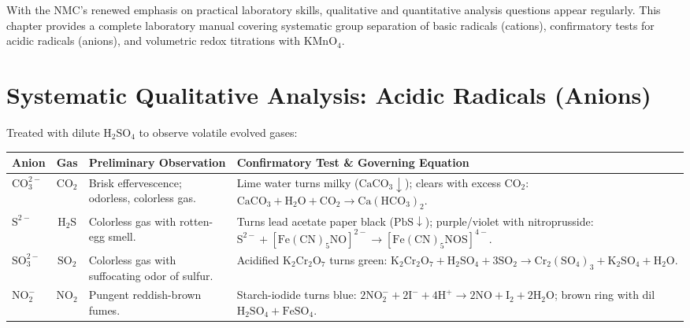 \documentclass[10pt,twoside,openright]{book}
\begin{document}
With the NMC's renewed emphasis on practical laboratory skills, qualitative and quantitative analysis questions appear regularly. This chapter provides a complete laboratory manual covering systematic group separation of basic radicals (cations), confirmatory tests for acidic radicals (anions), and volumetric redox titrations with KMnO$_4$.

\section{Systematic Qualitative Analysis: Acidic Radicals (Anions)}

\begin{conceptbox}
Treated with dilute $\mathrm{H_2SO_4}$ to observe volatile evolved gases:
\begin{center}
\scriptsize
\setlength{\tabcolsep}{2.5pt}
\renewcommand{\arraystretch}{1.15}
\begin{tabularx}{\linewidth}{|l|c|p{2.6cm}|X|}
\hline
\textbf{Anion} & \textbf{Gas} & \textbf{Preliminary Observation} & \textbf{Confirmatory Test \& Governing Equation} \\
\hline
$\mathrm{CO_3^{2-}}$ & $\mathrm{CO_2}$ & Brisk effervescence; odorless, colorless gas. & Lime water turns milky ($\mathrm{CaCO}_3 \downarrow$); clears with excess $\mathrm{CO_2}$: $\mathrm{CaCO_3} + \mathrm{H_2O} + \mathrm{CO_2} \to \mathrm{Ca(HCO_3)_2}$. \\
\hline
$\mathrm{S^{2-}}$ & $\mathrm{H_2S}$ & Colorless gas with rotten-egg smell. & Turns lead acetate paper black ($\mathrm{PbS} \downarrow$); purple/violet with nitroprusside: $\mathrm{S^{2-}} + [\mathrm{Fe(CN)_5NO}]^{2-} \to [\mathrm{Fe(CN)_5NOS}]^{4-}$. \\
\hline
$\mathrm{SO_3^{2-}}$ & $\mathrm{SO_2}$ & Colorless gas with suffocating odor of sulfur. & Acidified $\mathrm{K_2Cr_2O_7}$ turns green: $\mathrm{K_2Cr_2O_7} + \mathrm{H_2SO_4} + 3\mathrm{SO_2} \to \mathrm{Cr_2(SO_4)_3} + \mathrm{K_2SO_4} + \mathrm{H_2O}$. \\
\hline
$\mathrm{NO_2^-}$ & $\mathrm{NO_2}$ & Pungent reddish-brown fumes. & Starch-iodide turns blue: $2\mathrm{NO_2^-} + 2\mathrm{I^-} + 4\mathrm{H}^+ \to 2\mathrm{NO} + \mathrm{I_2} + 2\mathrm{H_2O}$; brown ring with dil $\mathrm{H_2SO_4} + \mathrm{FeSO_4}$. \\
\hline
\end{tabularx}
\end{center}
\end{conceptbox}
\end{document}
